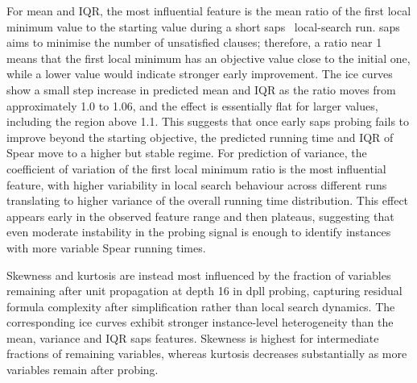 {For mean and IQR, the most influential feature is the mean ratio of the first local minimum value to the starting value during a short \gls{saps}~\citep{HutEtAl02} local-search run.
\Gls{saps} aims to minimise the number of unsatisfied clauses; therefore, a ratio near 1 means that the first local minimum has an objective value close to the initial one, while a lower value would indicate stronger early improvement.
The \gls{ice} curves show a small step increase in predicted mean and IQR as the ratio moves from approximately 1.0 to 1.06, and the effect is essentially flat for larger values, including the region above 1.1.
This suggests that once early \gls{saps} probing fails to improve beyond the starting objective, the predicted running time and IQR of Spear move to a higher but stable regime.
For prediction of variance, the coefficient of variation of the first local minimum ratio is the most influential feature, with higher variability in local search behaviour across different runs translating to higher variance of the overall running time distribution.
This effect appears early in the observed feature range and then plateaus, suggesting that even moderate instability in the probing signal is enough to identify instances with more variable Spear running times.

Skewness and kurtosis are instead most influenced by the fraction of variables remaining after unit propagation at depth 16 in \gls{dpll} probing, capturing residual formula complexity after simplification rather than local search dynamics.
The corresponding \gls{ice} curves exhibit stronger instance-level heterogeneity than the mean, variance and IQR \gls{saps} features.
Skewness is highest for intermediate fractions of remaining variables, whereas kurtosis decreases substantially as more variables remain after probing.


}
